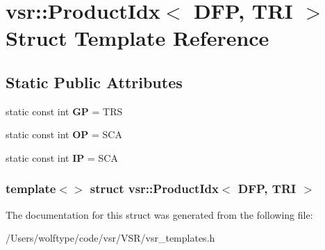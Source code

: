 \hypertarget{structvsr_1_1_product_idx_3_01_d_f_p_00_01_t_r_i_01_4}{\section{vsr\-:\-:Product\-Idx$<$ D\-F\-P, T\-R\-I $>$ Struct Template Reference}
\label{structvsr_1_1_product_idx_3_01_d_f_p_00_01_t_r_i_01_4}
}
\subsection*{Static Public Attributes}
\begin{DoxyCompactItemize}
\item 
\hypertarget{structvsr_1_1_product_idx_3_01_d_f_p_00_01_t_r_i_01_4_a952e358d374e60ce9d518ea3074629b8}{static const int {\bfseries G\-P} = T\-R\-S}\label{structvsr_1_1_product_idx_3_01_d_f_p_00_01_t_r_i_01_4_a952e358d374e60ce9d518ea3074629b8}

\item 
\hypertarget{structvsr_1_1_product_idx_3_01_d_f_p_00_01_t_r_i_01_4_ab016f831681ee79475069aa9e2766f53}{static const int {\bfseries O\-P} = S\-C\-A}\label{structvsr_1_1_product_idx_3_01_d_f_p_00_01_t_r_i_01_4_ab016f831681ee79475069aa9e2766f53}

\item 
\hypertarget{structvsr_1_1_product_idx_3_01_d_f_p_00_01_t_r_i_01_4_a92a3830369ec642c01f032fb0f0f7309}{static const int {\bfseries I\-P} = S\-C\-A}\label{structvsr_1_1_product_idx_3_01_d_f_p_00_01_t_r_i_01_4_a92a3830369ec642c01f032fb0f0f7309}

\end{DoxyCompactItemize}
\subsubsection*{template$<$$>$ struct vsr\-::\-Product\-Idx$<$ D\-F\-P, T\-R\-I $>$}



The documentation for this struct was generated from the following file\-:\begin{DoxyCompactItemize}
\item 
/\-Users/wolftype/code/vsr/\-V\-S\-R/vsr\-\_\-templates.\-h\end{DoxyCompactItemize}
